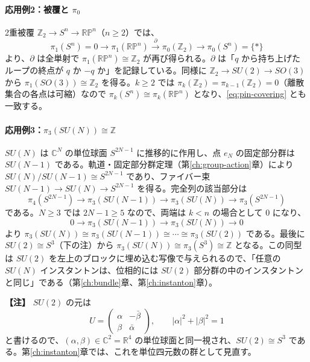 \documentclass[uplatex, dvipdfmx, book]{jsbook}
\newenvironment{note}{\vspace{1ex}\par\footnotesize\noindent\textbf{【注】}}{\par\vspace{1ex}}
\begin{document}
\paragraph{応用例2：被覆と $\pi_0$}
2重被覆 $\mathbb{Z}_2 \to S^n \to \mathbb{RP}^n$（$n \ge 2$）では、
\begin{equation*}
    \pi_1(S^n) = 0 \to \pi_1(\mathbb{RP}^n) \xrightarrow{\ \partial\ } \pi_0(\mathbb{Z}_2) \to \pi_0(S^n) = \{*\}
\end{equation*}
より、$\partial$ は全単射で $\pi_1(\mathbb{RP}^n) \cong \mathbb{Z}_2$ が再び得られる。$\partial$ は「$q$ から持ち上げたループの終点が $q$ か $-q$ か」を記録している。同様に $\mathbb{Z}_2 \to SU(2) \to SO(3)$ から $\pi_1(SO(3)) \cong \mathbb{Z}_2$ を得る。$k \ge 2$ では $\pi_k(\mathbb{Z}_2) = \pi_{k-1}(\mathbb{Z}_2) = 0$（離散集合の各点は可縮）なので $\pi_k(S^n) \cong \pi_k(\mathbb{RP}^n)$ となり、\eqref{eq:pin-covering} とも一致する。

\paragraph{応用例3：$\pi_3(SU(N)) \cong \mathbb{Z}$}
$SU(N)$ は $\mathbb{C}^N$ の単位球面 $S^{2N-1}$ に推移的に作用し、点 $e_N$ の固定部分群は $SU(N-1)$ である。軌道・固定部分群定理（第\ref{ch:group-action}章）により $SU(N)/SU(N-1) \cong S^{2N-1}$ であり、ファイバー束 $SU(N-1) \to SU(N) \to S^{2N-1}$ を得る。完全列の該当部分は
\begin{equation*}
    \pi_4(S^{2N-1}) \to \pi_3(SU(N-1)) \to \pi_3(SU(N)) \to \pi_3(S^{2N-1})
\end{equation*}
である。$N \ge 3$ では $2N - 1 \ge 5$ なので、両端は $k < n$ の場合として $0$ になり、
\begin{equation*}
    0 \to \pi_3(SU(N-1)) \to \pi_3(SU(N)) \to 0
\end{equation*}
より $\pi_3(SU(N)) \cong \pi_3(SU(N-1)) \cong \cdots \cong \pi_3(SU(2))$ である。最後に $SU(2) \cong S^3$（下の注）から $\pi_3(SU(N)) \cong \pi_3(S^3) \cong \mathbb{Z}$ となる。この同型は $SU(2)$ を左上のブロックに埋め込む写像で与えられるので、「任意の $SU(N)$ インスタントンは、位相的には $SU(2)$ 部分群の中のインスタントンと同じ」である（第\ref{ch:bundle}章、第\ref{ch:instanton}章）。

\begin{note}
$SU(2)$ の元は
\begin{equation*}
    U = \begin{pmatrix} \alpha & -\bar{\beta} \\ \beta & \bar{\alpha} \end{pmatrix}, \qquad |\alpha|^2 + |\beta|^2 = 1
\end{equation*}
と書けるので、$(\alpha, \beta) \in \mathbb{C}^2 = \mathbb{R}^4$ の単位球面と同一視され、$SU(2) \cong S^3$ である。第\ref{ch:instanton}章では、これを単位四元数の群として見直す。
\end{note}
\end{document}

